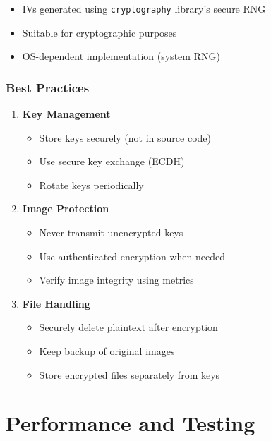 \documentclass[12pt,a4paper]{report}
\begin{document}
\begin{itemize}
    \item IVs generated using \texttt{cryptography} library's secure RNG
    \item Suitable for cryptographic purposes
    \item OS-dependent implementation (system RNG)
\end{itemize}

\subsection{Best Practices}

\begin{enumerate}
    \item \textbf{Key Management}
    \begin{itemize}
        \item Store keys securely (not in source code)
        \item Use secure key exchange (ECDH)
        \item Rotate keys periodically
    \end{itemize}
    
    \item \textbf{Image Protection}
    \begin{itemize}
        \item Never transmit unencrypted keys
        \item Use authenticated encryption when needed
        \item Verify image integrity using metrics
    \end{itemize}
    
    \item \textbf{File Handling}
    \begin{itemize}
        \item Securely delete plaintext after encryption
        \item Keep backup of original images
        \item Store encrypted files separately from keys
    \end{itemize}
\end{enumerate}

\chapter{Performance and Testing}
\end{document}
